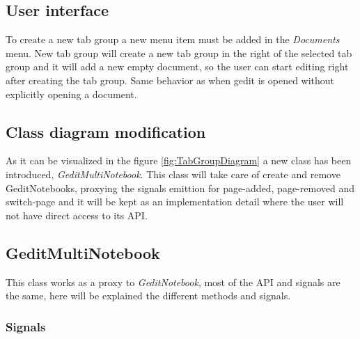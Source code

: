 \subsection{User interface}


To create a new tab group a new menu item must be added in the \emph{Documents} menu. New tab group will create a new tab group in the right of the selected tab group and it will add a new empty document, so the user can start editing right after creating the tab group. Same behavior as when gedit is opened without explicitly opening a document.

\newpage
\subsection{Class diagram modification}


As it can be visualized in the figure \ref{fig:TabGroupDiagram} a new class has been introduced, \emph{GeditMultiNotebook}. This class will take care of create and remove GeditNotebooks, proxying the signals emittion for page-added, page-removed and switch-page and it will be kept as an implementation detail where the user will not have direct access to its API.

\newpage
\subsection{GeditMultiNotebook}

This class works as a proxy to \emph{GeditNotebook}, most of the API and signals are the same, here will be explained the different methods and signals.

\subsubsection{Signals}

